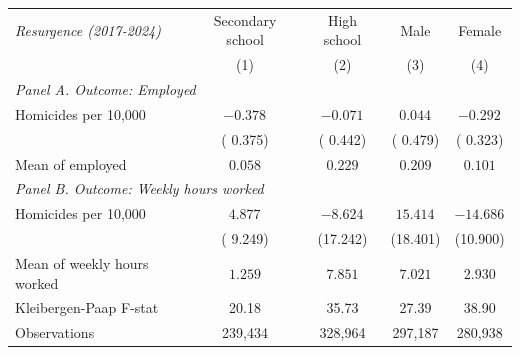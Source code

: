 \begin{tabular}{l c c c c}
\hline\hline
{\small \textit{Resurgence (2017-2024)}} & Secondary school & High school & Male & Female \\
 & (1) & (2) & (3) & (4) \\
\hline
\multicolumn{5}{l}{{\small \textit{Panel A. Outcome: Employed}}} \\
Homicides per 10,000
 & $-0.378^{}$ & $-0.071^{}$ & $ 0.044^{}$ & $-0.292^{}$ \\
 & ( 0.375) & ( 0.442) & ( 0.479) & ( 0.323) \\
Mean of employed
 & $ 0.058$ & $ 0.229$ & $ 0.209$ & $ 0.101$ \\
\hline
\multicolumn{5}{l}{{\small \textit{Panel B. Outcome: Weekly hours worked}}} \\
Homicides per 10,000
 & $ 4.877^{}$ & $-8.624^{}$ & $15.414^{}$ & $-14.686^{}$ \\
 & ( 9.249) & (17.242) & (18.401) & (10.900) \\
Mean of weekly hours worked
 & $ 1.259$ & $ 7.851$ & $ 7.021$ & $ 2.930$ \\
\hline
Kleibergen-Paap F-stat
 &  20.18 &  35.73 &  27.39 &  38.90 \\
\hline
Observations
 &   239,434 &   328,964 &   297,187 &   280,938 \\
\hline\hline
\end{tabular}
